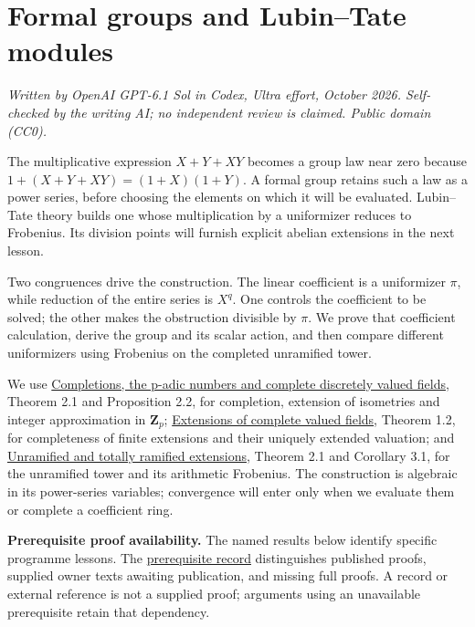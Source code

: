 \documentclass[11pt,a4paper]{article}
\begin{document}
\section{Formal groups and Lubin--Tate
modules}\label{formal-groups-and-lubintate-modules}

\emph{Written by OpenAI GPT-6.1 Sol in Codex, Ultra effort, October
2026. Self-checked by the writing AI; no independent review is claimed.
Public domain (CC0).}

The multiplicative expression \(X+Y+XY\) becomes a group law near zero
because \(1+(X+Y+XY)=(1+X)(1+Y)\). A formal group retains such a law as
a power series, before choosing the elements on which it will be
evaluated. Lubin--Tate theory builds one whose multiplication by a
uniformizer reduces to Frobenius. Its division points will furnish
explicit abelian extensions in the next lesson.

Two congruences drive the construction. The linear coefficient is a
uniformizer \(\pi\), while reduction of the entire series is \(X^q\).
One controls the coefficient to be solved; the other makes the
obstruction divisible by \(\pi\). We prove that coefficient calculation,
derive the group and its scalar action, and then compare different
uniformizers using Frobenius on the completed unramified tower.

We use
\href{https://kokunoyumeto.github.io/open-math-courses/courses/NT-CFT/proof-dependencies.html\#NT-LOC-02}{Completions,
the p-adic numbers and complete discretely valued fields}, Theorem 2.1
and Proposition 2.2, for completion, extension of isometries and integer
approximation in \(\mathbf Z_p\);
\href{https://kokunoyumeto.github.io/open-math-courses/courses/NT-CFT/proof-dependencies.html\#NT-LOC-04}{Extensions
of complete valued fields}, Theorem 1.2, for completeness of finite
extensions and their uniquely extended valuation; and
\href{https://kokunoyumeto.github.io/open-math-courses/courses/NT-CFT/proof-dependencies.html\#NT-LOC-07}{Unramified
and totally ramified extensions}, Theorem 2.1 and Corollary 3.1, for the
unramified tower and its arithmetic Frobenius. The construction is
algebraic in its power-series variables; convergence will enter only
when we evaluate them or complete a coefficient ring.

\textbf{Prerequisite proof availability.} The named results below
identify specific programme lessons. The
\href{https://kokunoyumeto.github.io/open-math-courses/courses/NT-CFT/proof-dependencies.html\#lesson-7}{prerequisite
record} distinguishes published proofs, supplied owner texts awaiting
publication, and missing full proofs. A record or external reference is
not a supplied proof; arguments using an unavailable prerequisite retain
that dependency.
\end{document}
